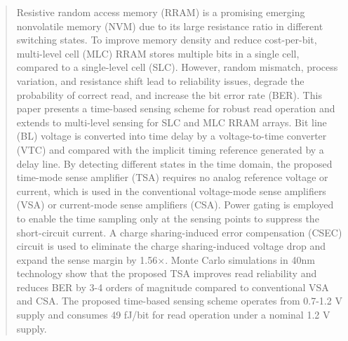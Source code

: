 \begin{abstract}
Resistive random access memory (RRAM) is a promising emerging nonvolatile memory (NVM) due to its large resistance ratio in different switching states. To improve memory density and reduce cost-per-bit, multi-level cell (MLC) RRAM stores multiple bits in a single cell, compared to a single-level cell (SLC). However, random mismatch, process variation, and resistance shift lead to reliability issues, degrade the probability of correct read, and increase the bit error rate (BER). 
This paper presents a time-based sensing scheme for robust read operation and extends to multi-level sensing for SLC and MLC RRAM arrays. Bit line (BL) voltage is converted into time delay by a voltage-to-time converter (VTC) and compared with the implicit timing reference generated by a delay line. By detecting different states in the time domain, the proposed time-mode sense amplifier (TSA) requires no analog reference voltage or current, which is used in the conventional voltage-mode sense amplifiers (VSA) or current-mode sense amplifiers (CSA). Power gating is employed to enable the time sampling only at the sensing points to suppress the short-circuit current. A charge sharing-induced error compensation (CSEC) circuit is used to eliminate the charge sharing-induced voltage drop and expand the sense margin by 1.56$\times$.
Monte Carlo simulations in 40nm technology show that the proposed TSA improves read reliability and reduces BER by 3-4 orders of magnitude compared to conventional VSA and CSA. 
The proposed time-based sensing scheme operates from 0.7-1.2 V supply and consumes 49 fJ/bit for read operation under a nominal 1.2 V supply.


\end{abstract}